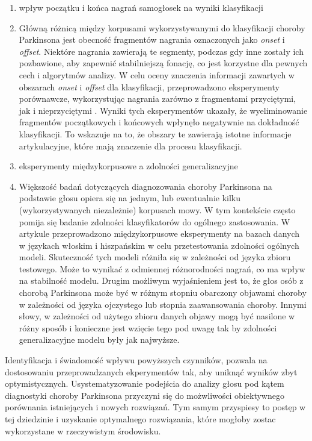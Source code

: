 \begin{enumerate}[label={\alph*)}]
	\item wpływ początku i końca  nagrań samogłosek na wyniki klasyfikacji
\item[] Główną różnicą między korpusami wykorzystywanymi do klasyfikacji choroby Parkinsona jest obecność fragmentów nagrania oznaczonych jako \emph{onset} i \emph{offset}.
Niektóre nagrania zawierają te segmenty, podczas gdy inne zostały ich pozbawione, aby zapewnić stabilniejszą fonację, co jest korzystne dla pewnych cech i algorytmów analizy.
W celu oceny znaczenia informacji zawartych w obszarach \emph{onset} i \emph{offset} dla klasyfikacji, przeprowadzono eksperymenty porównawcze,
wykorzystując nagrania zarówno z fragmentami przyciętymi, jak i nieprzyciętymi \cite{SustainedVowelsProblems}.
Wyniki tych eksperymentów ukazały, że wyeliminowanie fragmentów początkowych i końcowych wpłynęło negatywnie na dokładność klasyfikacji.
To wskazuje na to, że obszary te zawierają istotne informacje artykulacyjne, które mają znaczenie dla procesu klasyfikacji.

 	\item eksperymenty międzykorpusowe a zdolności generalizacyjne
	\item [] Większość badań dotyczących diagnozowania choroby Parkinsona na podstawie głosu opiera się na jednym, lub ewentualnie kilku (wykorzystywanych niezależnie)
korpusach mowy.
W tym kontekście często pomija się badanie zdolności klasyfikatorów do ogólnego zastosowania.
W artykule \cite{SustainedVowelsProblems} przeprowadzono międzykorpusowe eksperymenty na bazach danych w językach włoskim i hiszpańskim w celu
przetestowania zdolności ogólnych modeli. Skuteczność tych modeli różniła się w zależności od języka zbioru testowego.
Może to wynikać z odmiennej różnorodności nagrań, co ma wpływ na stabilność modelu.
Drugim możliwym wyjaśnieniem jest to, że głos osób z chorobą Parkinsona może być w różnym stopniu obarczony objawami choroby w zależności od języka ojczystego lub stopnia zaawansowania choroby.
Innymi słowy, w zależności od użytego zbioru danych objawy mogą być nasilone w różny sposób i konieczne jest wzięcie tego pod uwagę tak by zdolności generalizacyjne modelu były jak najwyższe.
\end{enumerate}


Identyfikacja i świadomość wpływu powyższych czynników, pozwala na dostosowaniu przeprowadzanych ekperymentów tak, aby uniknąć wyników zbyt optymistycznych.
Usystematyzowanie podejścia do analizy głosu pod kątem diagnostyki choroby Parkinsona przyczyni się do możwliwości obiektywnego porównania istniejących i nowych rozwiązań.
Tym samym przyspiesy to postęp w tej dziedzinie i uzyskanie optymalnego rozwiązania, które mogłoby zostac wykorzystane w rzeczywistym środowisku.

